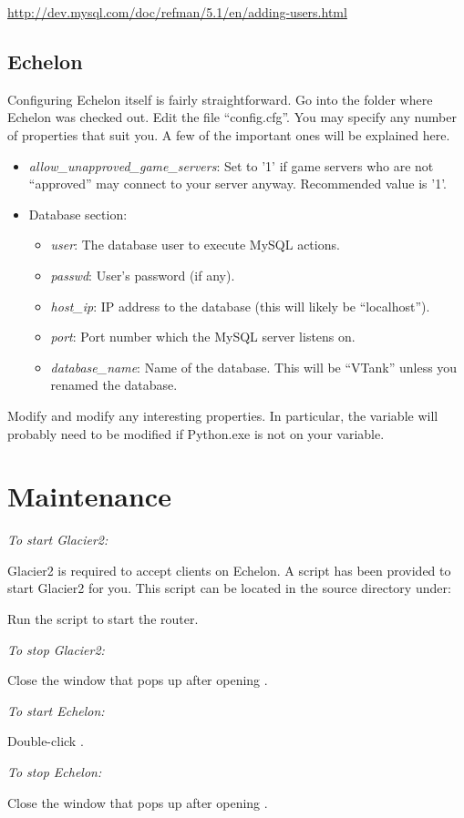 \url{http://dev.mysql.com/doc/refman/5.1/en/adding-users.html}

\subsection{Echelon}

Configuring Echelon itself is fairly straightforward. Go into the folder where Echelon was checked out. Edit the file ``config.cfg''. You may specify any number of properties that suit you. A few of the important ones will be explained here.

\begin{itemize}
	\item \emph{allow\_unapproved\_game\_servers}: Set to '1' if game servers who are not ``approved'' may connect to your server anyway. Recommended value is '1'.
	\item Database section:
		\begin{itemize}
			\item \emph{user}: The database user to execute MySQL actions.
			\item \emph{passwd}: User's password (if any).
			\item \emph{host\_ip}: IP address to the database (this will likely be ``localhost'').
			\item \emph{port}: Port number which the MySQL server listens on.
			\item \emph{database\_name}: Name of the database. This will be ``VTank'' unless you renamed the database.
		\end{itemize}
\end{itemize}

Modify  and modify any interesting properties. In particular, the  variable will probably need to be modified if Python.exe is not on your  variable.

\section{Maintenance}

\emph{To start Glacier2:}

Glacier2 is required to accept clients on Echelon. A script has been provided to start Glacier2 for you. This script can be located in the source directory under:


Run the  script to start the router.

\emph{To stop Glacier2:}

Close the window that pops up after opening .

\emph{To start Echelon:}

Double-click .

\emph{To stop Echelon:}

Close the window that pops up after opening .

